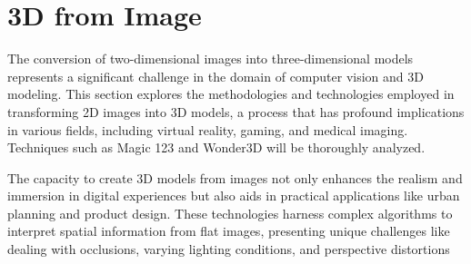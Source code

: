 \section{3D from Image}\label{3d from image}

The conversion of two-dimensional images into three-dimensional models represents a significant challenge in the domain of computer vision and 3D modeling. This section explores the methodologies and technologies employed in transforming 2D images into 3D models, a process that has profound implications in various fields, including virtual reality, gaming, and medical imaging. Techniques such as Magic 123 and Wonder3D will be thoroughly analyzed.

The capacity to create 3D models from images not only enhances the realism and immersion in digital experiences but also aids in practical applications like urban planning and product design. These technologies harness complex algorithms to interpret spatial information from flat images, presenting unique challenges like dealing with occlusions, varying lighting conditions, and perspective distortions


